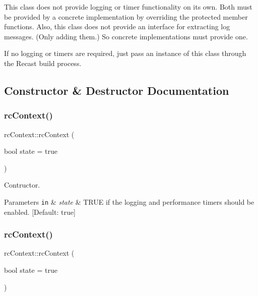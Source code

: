 \begin{DoxyParagraph}{}

\end{DoxyParagraph}
This class does not provide logging or timer functionality on its own. Both must be provided by a concrete implementation by overriding the protected member functions. Also, this class does not provide an interface for extracting log messages. (Only adding them.) So concrete implementations must provide one.

If no logging or timers are required, just pass an instance of this class through the Recast build process. 

\subsection{Constructor \& Destructor Documentation}
\mbox{\label{classrcContext_ae405295998d6c1db0ceb60d0f64559bc}} 
\subsubsection{\texorpdfstring{rc\+Context()}{rcContext()}\hspace{0.1cm}{\footnotesize\ttfamily [1/2]}}
{\footnotesize\ttfamily rc\+Context\+::rc\+Context (\begin{DoxyParamCaption}\item[{bool}]{state = {\ttfamily true} }\end{DoxyParamCaption})\hspace{0.3cm}{\ttfamily [inline]}}

Contructor. 
\begin{DoxyParams}[1]{Parameters}
\mbox{\tt in}  & {\em state} & T\+R\+UE if the logging and performance timers should be enabled. \mbox{[}Default\+: true\mbox{]} \\
\hline
\end{DoxyParams}
\mbox{\label{classrcContext_ae405295998d6c1db0ceb60d0f64559bc}} 
\subsubsection{\texorpdfstring{rc\+Context()}{rcContext()}\hspace{0.1cm}{\footnotesize\ttfamily [2/2]}}
{\footnotesize\ttfamily rc\+Context\+::rc\+Context (\begin{DoxyParamCaption}\item[{bool}]{state = {\ttfamily true} }\end{DoxyParamCaption})\hspace{0.3cm}{\ttfamily [inline]}}

